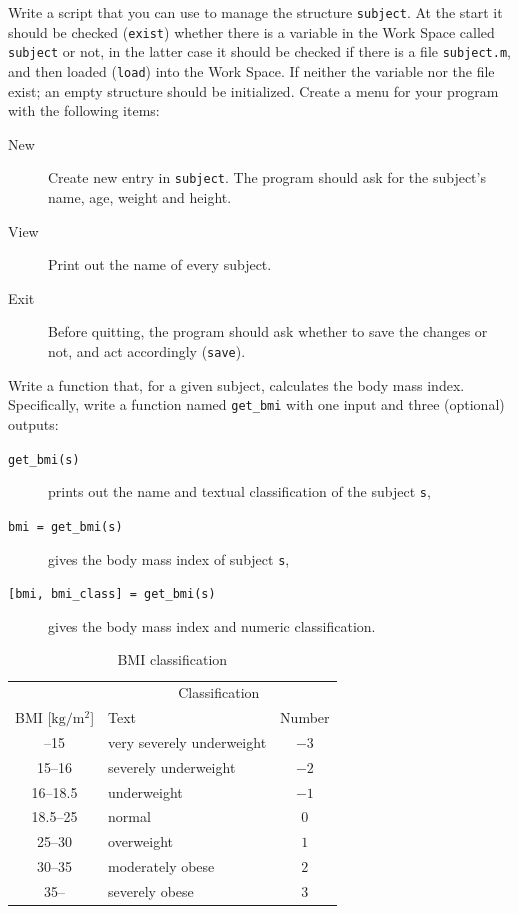 \documentclass[a4paper, fleqn, 10pt]{report}
\theoremstyle{definition}
\newenvironment{prb*}[1]
  {\renewcommand\theprb{\thechapter.\arabic{prb}\rlap{$^{#1}$}}\prb}
  {\endprb}
\newcommand{\mc}[1]{{\color{Blue}\tt #1}}
\newcommand{\mck}[1]{{\tt#1}}
\begin{document}
\begin{prb*}{5}
 Write a script that you can use to manage the structure {\tt subject}.
 At the start it should be checked (\mc{exist}) whether there is a variable in the Work Space called {\tt subject}
 or not, in the latter case it should be checked if there is a file {\tt subject.m}, and then loaded (\mc{load}) into the Work Space.
 If neither the variable nor the file exist; an empty structure should be initialized. 
 Create a menu for your program with the following items:
 \begin{description}
  \item[New] Create new entry in {\tt subject}. The program should ask for the subject's name, age, weight and height. 
  \item[View] Print out the name of every subject.
  \item[Exit] Before quitting, the program should ask whether to save the changes or not, and act accordingly (\mc{save}). 
 \end{description}
\end{prb*}




\begin{prb*}{5}
Write a function that, for a given subject,
calculates the body mass index.
Specifically, write a function named \mc{get\_bmi} with one input and three (optional) outputs:
\begin{description}
 \item[\mc{get\_bmi}\mck{(s)}] prints out the name and textual classification of the subject {\tt s},
 \item[\mck{bmi = }\mc{get\_bmi}\mck{(s)}] gives the body mass index of subject {\tt s},
 \item[\mck{[bmi, bmi\_class] = }\mc{get\_bmi}\mck{(s)}] gives the body mass index and numeric classification. 
\end{description}

\begin{table}[ht!]
 \centering
 \begin{tabular}{clc}
  \toprule
  & \multicolumn{2}{c}{Classification}\\
  \cmidrule(r){2-3}
  BMI [$\mathrm{kg}/\mathrm{m}^2$] & Text & Number \\
  \midrule
  --15 	 & very severely underweight 	& $-3$\\
  15--16 & severely underweight 	& $-2$\\
  16--18.5 & underweight 		& $-1$\\
  \midrule
  18.5--25 & normal 			& $0$\\
  \midrule
  25--30   & overweight			& $1$\\
  30--35   & moderately obese 		& $2$\\
  35--   & severely obese 		& $3$\\
  \bottomrule
 \end{tabular}\label{tab:BMI}
 \caption{BMI classification}
\end{table}
\end{prb*}
\end{document}
